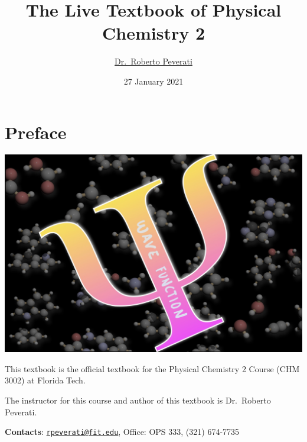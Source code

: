 \documentclass[
  9pt,
]{extbook}
\title{The Live Textbook of Physical Chemistry 2}
\author{\href{mailto:rpeverati@fit.edu}{Dr.~Roberto Peverati}}
\date{27 January 2021}
\let\oldmaketitle\maketitle
\theoremstyle{definition}
\theoremstyle{definition}
\theoremstyle{definition}
\theoremstyle{remark}
\begin{document}
\maketitle


%
\newpage

\let\maketitle\oldmaketitle

\renewcommand\thepage{\romannumeral\numexpr\value{page}-1\relax}


{
\setcounter{tocdepth}{1}
\tableofcontents
}
\renewcommand{\arraystretch}{1.8}

\hypertarget{preface}{%
\chapter*{Preface}\label{preface}}

\begin{center}\includegraphics[width=0.8\linewidth]{./img/OEP_Figures.000} \end{center}

This textbook is the official textbook for the Physical Chemistry 2 Course (CHM 3002) at Florida Tech.

The instructor for this course and author of this textbook is Dr.~Roberto Peverati.

\textbf{Contacts}: \href{mailto:rpeverati@fit.edu}{\nolinkurl{rpeverati@fit.edu}}, Office: OPS 333, (321) 674-7735
\end{document}

